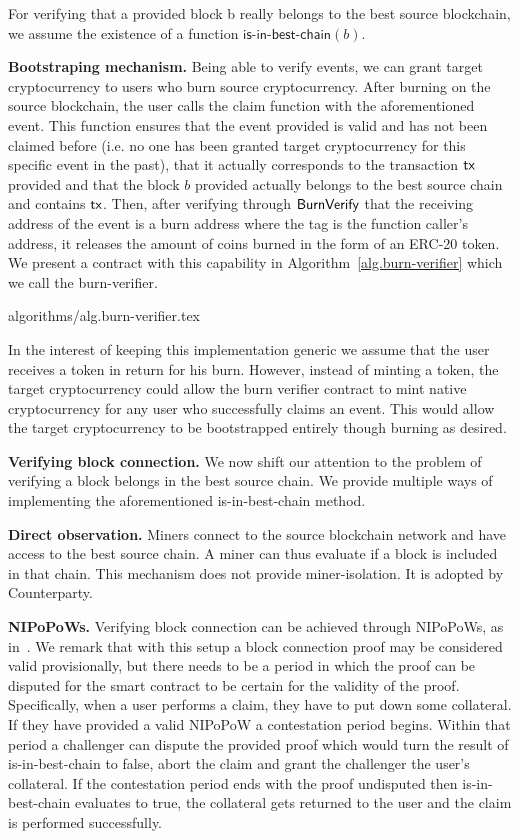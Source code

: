 For verifying that a provided block \textsf{b} really belongs to the best source blockchain, we assume the existence of a function $\textsf{is-in-best-chain}(b)$.

\noindent
\textbf{Bootstraping mechanism.}
Being able to verify events, we can grant target cryptocurrency to users who burn source cryptocurrency. After burning on the source blockchain, the user calls the \textsf{claim} function with the aforementioned event. This function ensures that the event provided is valid and has not been claimed before (i.e. no one has been granted target cryptocurrency for this specific event in the past), that it actually corresponds to the transaction $\textsf{tx}$ provided and that the block $b$ provided actually belongs to the best source chain and contains $\textsf{tx}$. Then, after verifying through $\mathsf{BurnVerify}$ that the receiving address of the event is a burn address where the tag is the function caller's address, it releases the amount of coins burned in the form of an ERC-20 token. We present a contract with this capability in Algorithm~\ref{alg.burn-verifier} which we call the \textsf{burn-verifier}.

{algorithms/alg.burn-verifier.tex}

In the interest of keeping this implementation generic we assume that the user receives a token in return for his burn. However, instead of minting a token, the target cryptocurrency could allow the burn verifier contract to mint native cryptocurrency for any user who successfully claims an event. This would allow the target cryptocurrency to be bootstrapped entirely though burning as desired.

\noindent
\textbf{Verifying block connection.}
We now shift our attention to the problem of verifying a block belongs in the best source chain. We provide multiple ways of implementing the aforementioned \textsf{is-in-best-chain} method.

\noindent
\textbf{Direct observation.}
Miners connect to the source blockchain network and have access to the best source chain. A miner can thus evaluate if a block is included in that chain. This mechanism does not provide miner-isolation. It is adopted by Counterparty.

\noindent
\textbf{NIPoPoWs.}
Verifying block connection can be achieved through NIPoPoWs, as in~\cite{pow-sidechains}.
We remark that with this setup a block connection proof may be considered valid provisionally, but there needs to be a period in which the proof can be disputed for the smart contract to be certain for the validity of the proof. Specifically, when a user performs a claim, they have to put down some collateral. If they have provided a valid NIPoPoW a contestation period begins. Within that period a challenger can dispute the provided proof which would turn the result of \textsf{is-in-best-chain} to false, abort the claim and grant the challenger the user's collateral. If the contestation period ends with the proof undisputed then \textsf{is-in-best-chain} evaluates to true, the collateral gets returned to the user and the claim is performed successfully.


